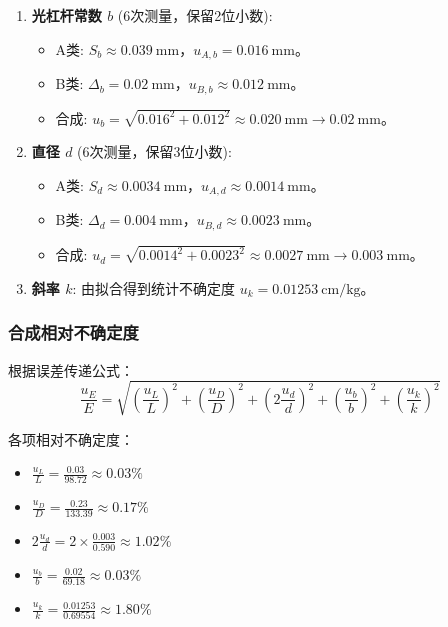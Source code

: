 \documentclass{../template/Report}%
\begin{document}
\begin{fullreportonly}
\begin{enumerate}
        \item \textbf{光杠杆常数 $b$} (6次测量，保留2位小数):
              \begin{itemize}
                  \item A类: $S_b \approx \SI{0.039}{\milli\meter}$，$u_{A,b} = \SI{0.016}{\milli\meter}$。
                  \item B类: $\Delta_b = \SI{0.02}{\milli\meter}$，$u_{B,b} \approx \SI{0.012}{\milli\meter}$。
                  \item 合成: $u_b = \sqrt{0.016^2 + 0.012^2} \approx \SI{0.020}{\milli\meter} \rightarrow \SI{0.02}{\milli\meter}$。
              \end{itemize}

        \item \textbf{直径 $d$} (6次测量，保留3位小数):
              \begin{itemize}
                  \item A类: $S_d \approx \SI{0.0034}{\milli\meter}$，$u_{A,d} \approx \SI{0.0014}{\milli\meter}$。
                  \item B类: $\Delta_d = \SI{0.004}{\milli\meter}$，$u_{B,d} \approx \SI{0.0023}{\milli\meter}$。
                  \item 合成: $u_d = \sqrt{0.0014^2 + 0.0023^2} \approx \SI{0.0027}{\milli\meter} \rightarrow \SI{0.003}{\milli\meter}$。
              \end{itemize}

        \item \textbf{斜率 $k$}:
              由拟合得到统计不确定度 $u_k = \SI{0.01253}{\centi\meter\per\kilo\gram}$。
    \end{enumerate}

    \subsubsection{合成相对不确定度}
    根据误差传递公式：
    $$ \frac{u_E}{E} = \sqrt{\left(\frac{u_L}{L}\right)^2 + \left(\frac{u_D}{D}\right)^2 + \left(2\frac{u_d}{d}\right)^2 + \left(\frac{u_b}{b}\right)^2 + \left(\frac{u_k}{k}\right)^2} $$

    各项相对不确定度：
    \begin{itemize}
        \item $\frac{u_L}{L} = \frac{0.03}{98.72} \approx 0.03\%$
        \item $\frac{u_D}{D} = \frac{0.23}{133.39} \approx 0.17\%$
        \item $2\frac{u_d}{d} = 2 \times \frac{0.003}{0.590} \approx 1.02\%$
        \item $\frac{u_b}{b} = \frac{0.02}{69.18} \approx 0.03\%$
        \item $\frac{u_k}{k} = \frac{0.01253}{0.69554} \approx 1.80\%$
    \end{itemize}


\end{fullreportonly}
\end{document}
